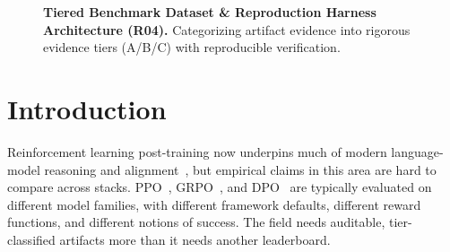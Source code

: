 \documentclass{article}
\begin{document}
\begin{figure}[htbp]
\centering
{}
\caption{\textbf{Tiered Benchmark Dataset \& Reproduction Harness Architecture (R04).} Categorizing artifact evidence into rigorous evidence tiers (A/B/C) with reproducible verification.}
\label{fig:dnb_benchmark_architecture}
\end{figure}
\section{Introduction}
\label{sec:intro}

Reinforcement learning post-training now underpins much of modern
language-model reasoning and alignment~\citep{ouyang2022training,guo2025deepseekr1nature}, but empirical claims in this area are hard to
compare across stacks. PPO~\citep{schulman2017proximal},
GRPO~\citep{shao2024deepseekmath}, and DPO~\citep{rafailov2024direct} are
typically evaluated on different model families, with different framework
defaults, different reward functions, and different notions of success. The
field needs auditable, tier-classified artifacts more than it needs another
leaderboard.
\end{document}
